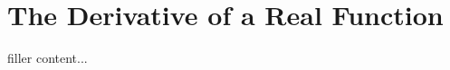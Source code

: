 \section{The Derivative of a Real Function}\label{sec:the-derivative-of-a-real-function}

filler content...

